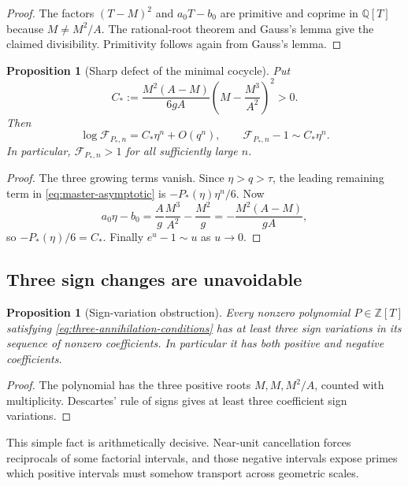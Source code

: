 \documentclass[11pt,oneside]{article}
\newtheorem{proposition}[theorem]{Proposition}
\theoremstyle{definition}
\theoremstyle{remark}
\newcommand{\Z}{\mathbb Z}
\newcommand{\Q}{\mathbb Q}
\newcommand{\cF}{\mathcal F}
\begin{document}
\begin{proof}
The factors $(T-M)^2$ and $a_0T-b_0$ are primitive and coprime in $\Q[T]$ because
$M\ne M^2/A$.  The rational-root theorem and Gauss's lemma give the claimed divisibility.
Primitivity follows again from Gauss's lemma.
\end{proof}

\begin{proposition}[Sharp defect of the minimal cocycle]
\label{prop:minimal-defect}
Put
\begin{equation}
 C_*:=\frac{M^2(A-M)}{6gA}
       \left(M-\frac{M^3}{A^2}\right)^2>0.
 \label{eq:Cstar}
\end{equation}
Then
\begin{equation}
 \log\cF_{P_*,n}
 =C_*\eta^n+O(q^n),
 \qquad
 \cF_{P_*,n}-1\sim C_*\eta^n.
 \label{eq:minimal-asymptotic}
\end{equation}
In particular, $\cF_{P_*,n}>1$ for all sufficiently large $n$.
\end{proposition}

\begin{proof}
The three growing terms vanish.  Since $\eta>q>\tau$, the leading remaining term in
\eqref{eq:master-asymptotic} is $-P_*(\eta)\eta^n/6$.  Now
\[
 a_0\eta-b_0
 =\frac Ag\frac{M^3}{A^2}-\frac{M^2}{g}
 =-\frac{M^2(A-M)}{gA},
\]
so $-P_*(\eta)/6=C_*$.  Finally $e^u-1\sim u$ as $u\to0$.
\end{proof}

\subsection{Three sign changes are unavoidable}

\begin{proposition}[Sign-variation obstruction]
\label{prop:sign-variation}
Every nonzero polynomial $P\in\Z[T]$ satisfying
\eqref{eq:three-annihilation-conditions} has at least three sign variations in its sequence
of nonzero coefficients.  In particular it has both positive and negative coefficients.
\end{proposition}

\begin{proof}
The polynomial has the three positive roots $M,M,M^2/A$, counted with multiplicity.
Descartes' rule of signs gives at least three coefficient sign variations.
\end{proof}

This simple fact is arithmetically decisive.  Near-unit cancellation forces reciprocals of
some factorial intervals, and those negative intervals expose primes which positive intervals
must somehow transport across geometric scales.
\end{document}
